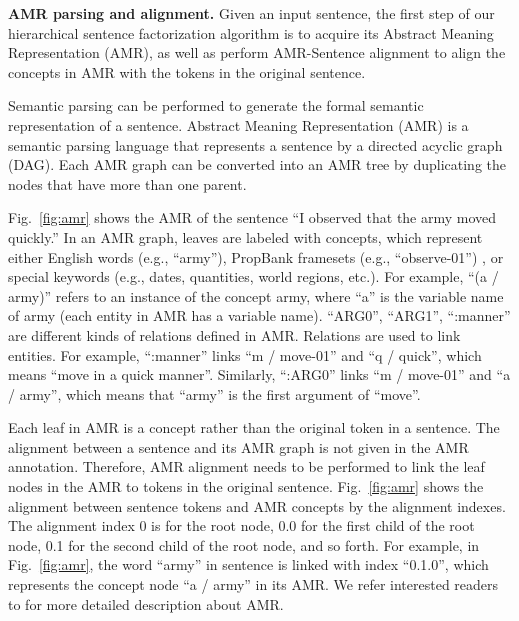 \textbf{AMR parsing and alignment.}
Given an input sentence, the first step of our hierarchical sentence factorization algorithm is to acquire its Abstract Meaning Representation (AMR), as well as perform AMR-Sentence alignment to align the concepts in AMR with the tokens in the original sentence.
 
Semantic parsing \cite{baker1998berkeley,kingsbury2002treebank,berant2014semantic,banarescu2013abstract, damonte2016incremental} can be performed to generate the formal semantic representation of a sentence.
Abstract Meaning Representation (AMR) \cite{banarescu2013abstract} is a semantic parsing language that represents a sentence by a directed acyclic graph (DAG).
Each AMR graph can be converted into an AMR tree by duplicating the nodes that have more than one parent.

Fig.~\ref{fig:amr} shows the AMR of the sentence ``I observed that the army moved quickly.''
In an AMR graph, leaves are labeled with concepts, which represent either English words (e.g., ``army''), PropBank framesets (e.g., ``observe-01'') \cite{kingsbury2002treebank}, or special keywords (e.g., dates, quantities, world regions, etc.). For example, ``(a / army)'' refers to an instance of the concept army, where ``a'' is the variable name of army (each entity in AMR has a variable name).  ``ARG0'', ``ARG1'', ``:manner'' are different kinds of relations defined in AMR. Relations are used to link entities. For example, ``:manner'' links ``m / move-01'' and ``q / quick'', which means ``move in a quick manner''. Similarly, ``:ARG0'' links ``m / move-01'' and ``a / army'', which means that ``army'' is the first argument of ``move''.




Each leaf in AMR is a concept rather than the original token in a sentence. 
The alignment between a sentence and its AMR graph is not given in the AMR annotation. Therefore, AMR alignment \cite{pourdamghani2014aligning} needs to be performed to link the leaf nodes in the AMR to tokens in the original sentence.
Fig.~\ref{fig:amr} shows the alignment between sentence tokens and AMR concepts by the alignment indexes.
The alignment index $0$ is for the root node, 0.0 for the first child of the root node, 0.1 for the second child of the root node, and so forth. For example, in Fig.~\ref{fig:amr}, the word ``army'' in sentence is linked with index ``0.1.0'', which represents the concept node ``a / army'' in its AMR.
We refer interested readers to \cite{banarescu2013abstract,banarescu2012abstract} for more detailed description about AMR. 

